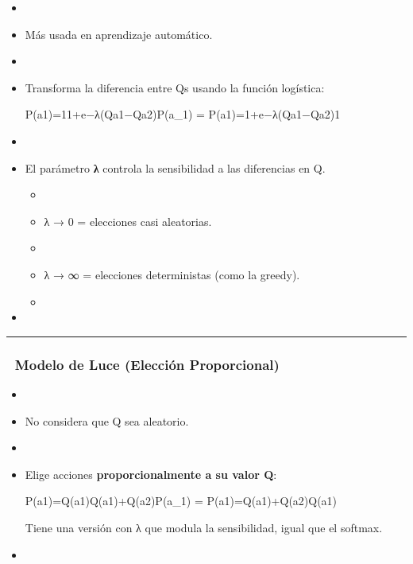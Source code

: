 \documentclass[
  letterpaper,
  DIV=11,
  numbers=noendperiod]{scrartcl}
\begin{document}
\begin{itemize}
\item
\item
  Más usada en aprendizaje automático.
\item
\item
  Transforma la diferencia entre Qs usando la función logística:

  P(a1)=11+e−λ(Qa1−Qa2)P(a\_1) =
  P(a1\hspace{0pt})=1+e−λ(Qa1\hspace{0pt}−Qa2\hspace{0pt})1\hspace{0pt}
\item
\item
  El parámetro \textbf{λ} controla la sensibilidad a las diferencias en
  Q.

  \begin{itemize}
  \item
  \item
    λ → 0 = elecciones casi aleatorias.
  \item
  \item
    λ → ∞ = elecciones deterministas (como la greedy).
  \item
  \end{itemize}
\item
\end{itemize}

\begin{center}\rule{0.5\linewidth}{0.5pt}\end{center}

\hypertarget{modelo-de-luce-elecciuxf3n-proporcional}{%
\subsubsection{\texorpdfstring{💖 \textbf{Modelo de Luce (Elección
Proporcional)}}{💖 Modelo de Luce (Elección Proporcional)}}\label{modelo-de-luce-elecciuxf3n-proporcional}}

\begin{itemize}
\item
\item
  No considera que Q sea aleatorio.
\item
\item
  Elige acciones \textbf{proporcionalmente a su valor Q}:

  P(a1)=Q(a1)Q(a1)+Q(a2)P(a\_1) =
  P(a1\hspace{0pt})=Q(a1\hspace{0pt})+Q(a2\hspace{0pt})Q(a1\hspace{0pt})\hspace{0pt}

  Tiene una versión con λ que modula la sensibilidad, igual que el
  softmax.
\item
\end{itemize}
\end{document}
